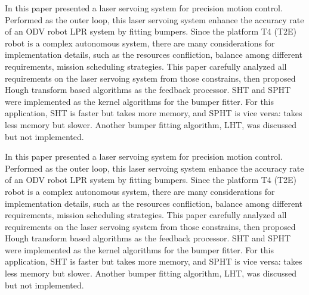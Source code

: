 \documentclass{article}
\begin{document}
In this paper presented a laser servoing system for precision motion control. Performed as the outer loop, this laser servoing system enhance the accuracy rate of an ODV robot LPR system by fitting bumpers. Since the platform T4 (T2E) robot is a complex autonomous system, there are many considerations for implementation details, such as the resources confliction, balance among different requirements, mission scheduling strategies. This paper carefully analyzed all requirements on the laser servoing system from those constrains, then proposed Hough transform based algorithms as the feedback processor. SHT and SPHT were implemented as the kernel algorithms for the bumper fitter. For this application, SHT is faster but takes more memory, and SPHT is vice versa: takes less memory but slower. Another bumper fitting algorithm, LHT, was discussed but not implemented.


In this paper presented a laser servoing system for precision motion control. Performed as the outer loop, this laser servoing system enhance the accuracy rate of an ODV robot LPR system by fitting bumpers. Since the platform T4 (T2E) robot is a complex autonomous system, there are many considerations for implementation details, such as the resources confliction, balance among different requirements, mission scheduling strategies. This paper carefully analyzed all requirements on the laser servoing system from those constrains, then proposed Hough transform based algorithms as the feedback processor. SHT and SPHT were implemented as the kernel algorithms for the bumper fitter. For this application, SHT is faster but takes more memory, and SPHT is vice versa: takes less memory but slower. Another bumper fitting algorithm, LHT, was discussed but not implemented.
\end{document}
